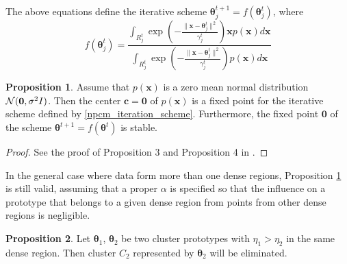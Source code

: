 \documentclass[conference]{IEEEtran}
\theoremstyle{definition}
\newtheorem*{proof}{Proof}
\newtheorem{prop}{Proposition}
\begin{document}
The above equations define the iterative scheme $\boldsymbol{\theta}_j^{t+1}=f(\boldsymbol{\theta}_j^{t})$, where
\begin{equation}
\label{npcm_iteration_scheme}
f(\boldsymbol{\theta}_j^t)=\frac{\int_{R_j^t} \exp\left(-\frac{\|\mathbf{x}-\boldsymbol{\theta}_j^t\|^2}{\gamma_j^t}\right)\mathbf{x}p(\mathbf{x})d\mathbf{x}}{\int_{R_j^t} \exp\left(-\frac{\|\mathbf{x}-\boldsymbol{\theta}_j^t\|^2}{\gamma_j^t}\right)p(\mathbf{x})d\mathbf{x}}
\end{equation}


\begin{prop}
Assume that $p(\mathbf{x})$ is a zero mean normal distribution ${\cal N}(\mathbf{0},\sigma^2I)$. Then the center $\mathbf{c}=\mathbf{0}$ of $p(\mathbf{x})$ is a fixed point for the iterative scheme defined by \eqref{npcm_iteration_scheme}. Furthermore, the fixed point $\mathbf{0}$ of the scheme $\boldsymbol{\theta}^{t+1}=f(\boldsymbol{\theta}^{t})$ is stable.
\label{prop_fix_stable}
\end{prop}

\begin{proof}
See the proof of Proposition 3 and Proposition 4 in \cite{xenaki_novel_2016}.
\end{proof}

In the general case where data form more than one dense regions, Proposition \ref{prop_fix_stable} is still valid, assuming that a proper $\alpha$ is specified so that the influence on a prototype that belongs to a given dense region from points from other dense regions is negligible.

\begin{prop}
Let $\boldsymbol{\theta}_1$, $\boldsymbol{\theta}_2$ be two cluster prototypes with $\eta_1>\eta_2$ in the same dense region. Then cluster $C_2$ represented by $\boldsymbol{\theta}_2$ will be eliminated.
\label{prop_eliminate}
\end{prop}
\end{document}

